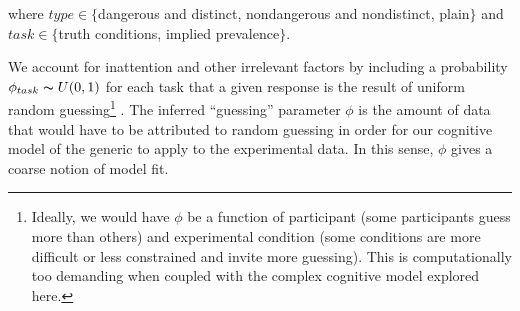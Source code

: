 \documentclass[10pt,letterpaper]{article}
\begin{document}
where $type \in \{$dangerous and distinct, nondangerous and nondistinct, plain$\}$ and $task \in \{$truth conditions, implied prevalence$\}$.

We account for inattention and other irrelevant factors by including a probability $\phi_{task}\thicksim U(0,1)$ for each task that a given response is the result of uniform random guessing\footnote{Ideally, we would have $\phi$ be a function of participant (some participants guess more than others) and experimental condition (some conditions are more difficult or less constrained and invite more guessing). This is computationally too demanding when coupled with the complex cognitive model explored here.}  \cite{LW2014}.
The inferred ``guessing'' parameter $\phi$ is the amount of data that would have to be attributed to random guessing in order for our cognitive model of the generic to apply to the experimental data. In this sense, $\phi$ gives a coarse notion of model fit. 




%
%
%
%
%
\end{document}
